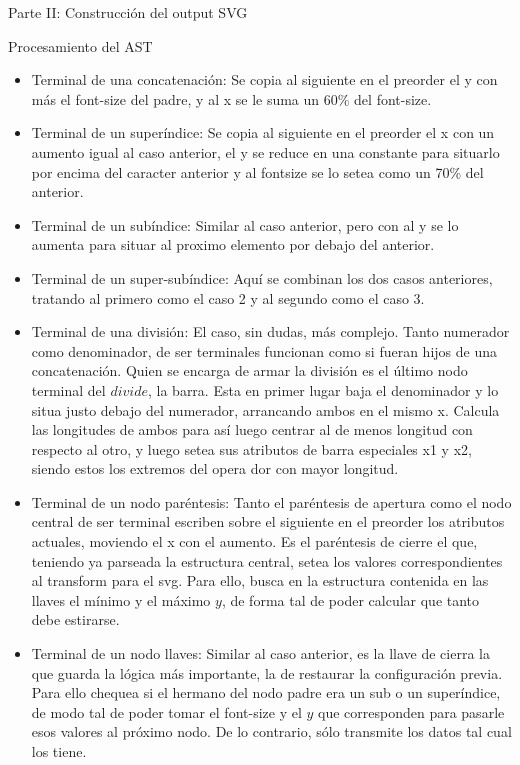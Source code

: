 \begin{section}{Parte II: Construcci\'on del output SVG}
\begin{subsection}{Procesamiento del AST}
\begin{itemize}
\item Terminal de una concatenaci\'on: Se copia al siguiente en el preorder el y con m\'as el font-size del padre, y al x se le suma un 60\% del font-size.
\item Terminal de un super\'indice: Se copia al siguiente en el preorder el x con un aumento igual al caso anterior, el y se reduce en una constante para situarlo por encima del caracter anterior y al fontsize se lo setea como un 70\% del anterior.
\item Terminal de un sub\'indice: Similar al caso anterior, pero con al y se lo aumenta para situar al proximo elemento por debajo del anterior.
\item Terminal de un super-sub\'indice: Aqu\'i se combinan los dos casos anteriores, tratando al primero como el caso 2 y al segundo como el caso 3.
\item Terminal de una divisi\'on: El caso, sin dudas, m\'as complejo. Tanto numerador como denominador, de ser terminales funcionan como si fueran hijos de una concatenaci\'on. Quien se encarga de armar la divisi\'on es el \'ultimo nodo terminal del $divide$, la barra. Esta en primer lugar baja el denominador y lo situa justo debajo del numerador, arrancando ambos en el mismo x. Calcula las longitudes de ambos para as\'i luego centrar al de menos longitud con respecto al otro, y luego setea sus atributos de barra especiales x1 y x2, siendo estos los extremos del opera dor con mayor longitud. 
\item Terminal de un nodo par\'entesis: Tanto el par\'entesis de apertura como el nodo central de ser terminal escriben sobre el siguiente en el preorder los atributos actuales, moviendo el x con el aumento. Es el par\'entesis de cierre el que, teniendo ya parseada la estructura central, setea los valores correspondientes al transform para el svg. Para ello, busca en la estructura contenida en las llaves el m\'inimo y el m\'aximo $y$, de forma tal de poder calcular que tanto debe estirarse.
\item Terminal de un nodo llaves: Similar al caso anterior, es la llave de cierra la que guarda la l\'ogica m\'as importante, la de restaurar la configuraci\'on previa. Para ello chequea si el hermano del nodo padre era un sub o un super\'indice, de modo tal de poder tomar el font-size y el $y$ que corresponden para pasarle esos valores al pr\'oximo nodo. De lo contrario, s\'olo transmite los datos tal cual los tiene.

\end{itemize}


\end{subsection}
\end{section}
